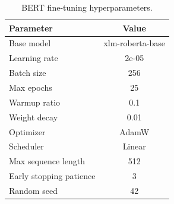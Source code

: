 \begin{table}[h!]
\centering
\caption{BERT fine-tuning hyperparameters.}
\label{tab:hyperparameters}
\begin{tabular}{lc}
\toprule
\textbf{Parameter} & \textbf{Value} \\
\midrule
Base model & xlm-roberta-base \\
Learning rate & 2e-05 \\
Batch size & 256 \\
Max epochs & 25 \\
Warmup ratio & 0.1 \\
Weight decay & 0.01 \\
Optimizer & AdamW \\
Scheduler & Linear \\
Max sequence length & 512 \\
Early stopping patience & 3 \\
Random seed & 42 \\
\bottomrule
\end{tabular}
\end{table}